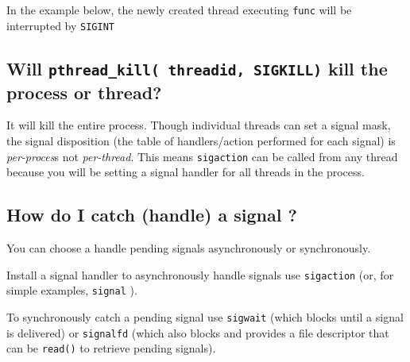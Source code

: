\begin{Shaded}
\begin{Highlighting}[]
  
\end{Highlighting}
\end{Shaded}

In the example below, the newly created thread executing \texttt{func}
will be interrupted by \texttt{SIGINT}

\begin{Shaded}
\begin{Highlighting}[]
\end{Highlighting}
\end{Shaded}

\subsection{\texorpdfstring{Will
\texttt{pthread\_kill(\ threadid,\ SIGKILL)} kill the process or
thread?}{Will pthread\_kill( threadid, SIGKILL) kill the process or thread?}}\label{will-pthreadux5fkill-threadid-sigkill-kill-the-process-or-thread}

It will kill the entire process. Though individual threads can set a
signal mask, the signal disposition (the table of handlers/action
performed for each signal) is \emph{per-proces}s not \emph{per-thread}.
This means \texttt{sigaction} can be called from any thread because you
will be setting a signal handler for all threads in the process.

\subsection{How do I catch (handle) a signal
?}\label{how-do-i-catch-handle-a-signal}

You can choose a handle pending signals asynchronously or synchronously.

Install a signal handler to asynchronously handle signals use
\texttt{sigaction} (or, for simple examples, \texttt{signal} ).

To synchronously catch a pending signal use \texttt{sigwait} (which
blocks until a signal is delivered) or \texttt{signalfd} (which also
blocks and provides a file descriptor that can be \texttt{read()} to
retrieve pending signals).

